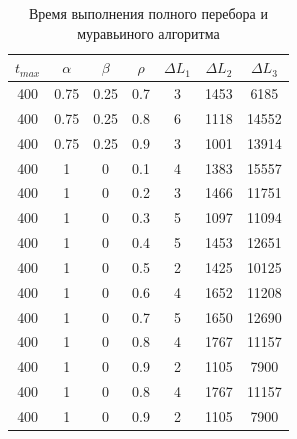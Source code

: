\documentclass[a4paper,oneside,14pt]{extreport}
\begin{document}
\newpage
\begin{table}[H]
	\begin{center}
		\caption[]{\label{tbl:only} Время выполнения полного перебора и муравьиного алгоритма}
		\begin{tabular}{|c|c|c|c|c|c|c|}
			\hline
			$t_{max}$ & $\alpha$ & $\beta$ & $\rho$ & $\Delta L_{1}$ & $\Delta L_{2}$ & $\Delta L_{3}$\\
			\hline			
			400 & 0.75 & 0.25 & 0.7 & 3 & 1453 & 6185 \\
			400 & 0.75 & 0.25 & 0.8 & 6 & 1118 & 14552 \\
			400 & 0.75 & 0.25 & 0.9 & 3 & 1001 & 13914 \\
			400 & 1 & 0 & 0.1 & 4 & 1383 & 15557 \\
			400 & 1 & 0 & 0.2 & 3 & 1466 & 11751 \\
			400 & 1 & 0 & 0.3 & 5 & 1097 & 11094 \\
			400 & 1 & 0 & 0.4 & 5 & 1453 & 12651 \\
			400 & 1 & 0 & 0.5 & 2 & 1425 & 10125 \\
			400 & 1 & 0 & 0.6 & 4 & 1652 & 11208 \\
			400 & 1 & 0 & 0.7 & 5 & 1650 & 12690 \\
			400 & 1 & 0 & 0.8 & 4 & 1767 & 11157 \\
			400 & 1 & 0 & 0.9 & 2 & 1105 & 7900 \\
			400 & 1 & 0 & 0.8 & 4 & 1767 & 11157 \\
			400 & 1 & 0 & 0.9 & 2 & 1105 & 7900 \\
			\hline 	
		\end{tabular}
	\end{center}
\end{table}
\end{document}
